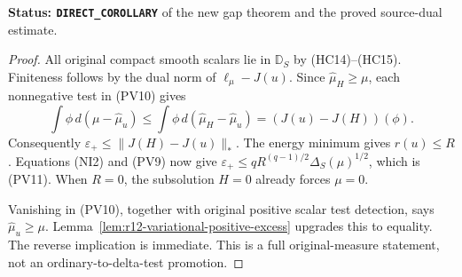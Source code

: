 \noindent\textbf{Status: \texttt{DIRECT\_COROLLARY}} of
the new gap theorem and the proved source-dual estimate.

\begin{proof}
All original compact smooth scalars lie in $\mathbb D_S$
by (HC14)--(HC15). Finiteness follows by the dual norm of
$\ell_\mu-J(u)$. Since $\widehat\mu_H\geq\mu$, each
nonnegative test in (PV10) gives
\[
 \int\phi\,d(\mu-\widehat\mu_u)
       \leq\int\phi\,d(\widehat\mu_H-\widehat\mu_u)
       =(J(u)-J(H))(\phi).
\]
Consequently $\varepsilon_+\leq\|J(H)-J(u)\|_*$.
The energy minimum gives $r(u)\leq R$. Equations (NI2)
and (PV9) now give
$\varepsilon_+\leq qR^{(q-1)/2}\Delta_S(\mu)^{1/2}$,
which is (PV11). When $R=0$, the subsolution $H=0$
already forces $\mu=0$.

Vanishing in (PV10), together with original positive
scalar test detection, says $\widehat\mu_u\geq\mu$.
Lemma~\ref{lem:r12-variational-positive-excess} upgrades
this to equality. The reverse implication is immediate.
This is a full original-measure statement, not an
ordinary-to-delta-test promotion.
\end{proof}

